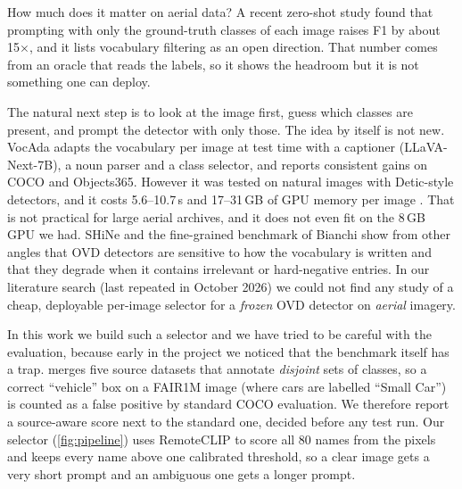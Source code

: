 How much does it matter on aerial data?
A recent zero-shot study \cite{tsourveloudis2026ovd} found that prompting \gdino with only the ground-truth classes of each \lae image raises F1 by about 15$\times$, and it lists vocabulary filtering as an open direction.
That number comes from an oracle that reads the labels, so it shows the headroom but it is not something one can deploy.

The natural next step is to look at the image first, guess which classes are present, and prompt the detector with only those.
The idea by itself is not new.
VocAda \cite{liu2025vocada} adapts the vocabulary per image at test time with a captioner (LLaVA-Next-7B), a noun parser and a class selector, and reports consistent gains on COCO and Objects365.
However it was tested on natural images with Detic-style detectors, and it costs 5.6--10.7\,s and 17--31\,GB of GPU memory per image \cite{liu2025vocada}.
That is not practical for large aerial archives, and it does not even fit on the 8\,GB GPU we had.
SHiNe \cite{liu2024shine} and the fine-grained benchmark of Bianchi \etal \cite{bianchi2024devil} show from other angles that OVD detectors are sensitive to how the vocabulary is written and that they degrade when it contains irrelevant or hard-negative entries.
In our literature search (last repeated in October 2026) we could not find any study of a cheap, deployable per-image selector for a \emph{frozen} OVD detector on \emph{aerial} imagery.

In this work we build such a selector and we have tried to be careful with the evaluation, because early in the project we noticed that the benchmark itself has a trap.
\lae merges five source datasets that annotate \emph{disjoint} sets of classes, so a correct ``vehicle'' box on a FAIR1M image (where cars are labelled ``Small Car'') is counted as a false positive by standard COCO evaluation.
We therefore report a source-aware score next to the standard one, decided before any test run.
Our selector (\cref{fig:pipeline}) uses RemoteCLIP \cite{liu2024remoteclip} to score all 80 names from the pixels and keeps every name above one calibrated threshold, so a clear image gets a very short prompt and an ambiguous one gets a longer prompt.

